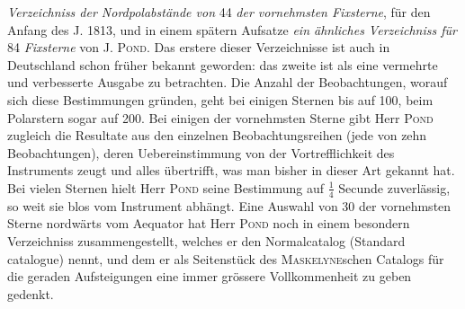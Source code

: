 \emph{Verzeichniss der Nordpolabstände von} 44 \emph{der vornehmsten Fixsterne}, für den Anfang des J. 1813, und in einem spätern Aufsatze \emph{ein ähnliches Verzeichniss für} 84 \emph{Fixsterne} von J. \textsc{Pond}. Das erstere dieser Verzeichnisse ist auch in Deutschland schon früher bekannt geworden: das zweite ist als eine vermehrte und verbesserte Ausgabe zu betrachten. Die Anzahl der Beobachtungen, worauf sich diese Bestimmungen gründen, geht bei einigen Sternen bis auf 100, beim Polarstern sogar auf 200. Bei einigen der vornehmsten Sterne gibt Herr \textsc{Pond} zugleich die Resultate aus den einzelnen Beobachtungsreihen (jede von zehn Beobachtungen), deren Uebereinstimmung von der Vortrefflichkeit des Instruments zeugt und alles übertrifft, was man bisher in dieser Art gekannt hat. Bei vielen Sternen hielt Herr \textsc{Pond} seine Bestimmung auf $\frac{1}{4}$ Secunde zuverlässig, so weit sie blos vom Instrument abhängt. Eine Auswahl von 30 der vornehmsten Sterne nordwärts vom Aequator hat Herr \textsc{Pond} noch in einem besondern Verzeichniss zusammengestellt, welches er den Normalcatalog (Standard catalogue) nennt, und dem er als Seitenstück des \textsc{Maskelyne}schen Catalogs für die geraden Aufsteigungen eine immer grössere Vollkommenheit zu geben gedenkt.

